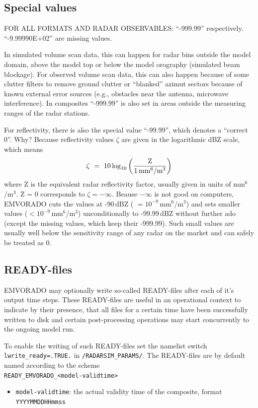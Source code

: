 \documentclass[10pt,a4paper,twoside,headinclude,footinclude,parskip=half]{scrartcl}
\newcommand{\myaktuellesection}{sec:intro}%
\newcommand{\labelsec}[1]{\label{#1}\renewcommand{\myaktuellesection}{#1}}%
\newcommand{\labelsec}[1]{\label{#1}}%
\newcommand{\srcform}[1]{\mbox{\texttt{#1}}\xspace}%
\newcommand{\paramform}[1]{\mbox{\texttt{#1}}\xspace}%
\begin{document}
\subsection{Special values}
\labelsec{sec:output:special}

FOR ALL FORMATS AND RADAR OBSERVABLES:  ``-999.99'' respectively. ``-9.99990E+02'' are missing values.

In simulated volume scan data, this can happen for radar bins outside the model domain, above the model top or below
the model orography (simulated beam blockage). For observed volume scan data, this can also happen
because of some clutter filters to remove ground clutter or ``blanked'' azimut sectors because of known
external error sources (e.g., obstacles near the antenna, microwave interference).
In composites ``-999.99'' is also set in areas outside the measuring ranges of the radar stations.

For reflectivity, there is also the special value ``-99.99'', which denotes a ``correct 0''.
Why?
Because reflectivity values $\zeta$ are given in the logarithmic dBZ scale,
which means
\begin{equation*}
\zeta\ =\ 10\log_{10}\left(\dfrac{\textnormal{Z}}{1\,\textnormal{mm$^6$/m$^3$}}\right)
\end{equation*}
where Z is the equivalent radar reflectivity factor, usually given in units of mm$^6$/m$^3$.
Z = 0 corresponds to $\zeta = -\infty$.
Beause $-\infty$ is not good on computers, EMVORADO cuts the values at -90\,dBZ ( $=10^{-9}$\,mm$^6$/m$^3$)
and sets smaller values ($< 10^{-9}$\,mm$^6$/m$^3$) unconditionally to -99.99\,dBZ without further ado (except
the missing values, which keep their -999.99). Such small values
are usually well below the sensitivity range of any radar on the market
and can safely be treated as 0.


\subsection{READY-files}
\labelsec{sec:output:ready}

EMVORADO may optionally write so-called READY-files after each of it's output time steps.
These READY-files are useful in an operational context to indicate by their presence, that all files for a certain time
have been successfully written to disk and certain post-processing operations may start
concurrently to the ongoing model run.

To enable the writing of such READY-files set the namelist switch \paramform{lwrite_ready=.TRUE.} in \srcform{/RADARSIM_PARAMS/}. The READY-files are by default named according to the scheme\\[0.5em]
\verb|READY_EMVORADO_<model-validtime>|
\begin{itemize}
\item \verb|model-validtime|: the actual validity time of the composite, format \verb|YYYYMMDDHHmmss|
\end{itemize}
\end{document}

